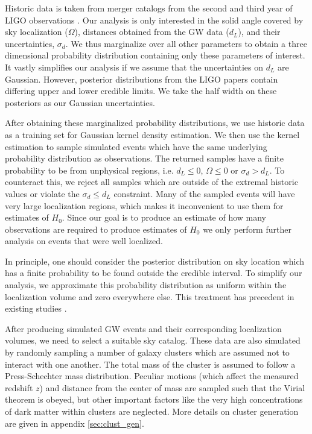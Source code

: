 
Historic data is taken from merger catalogs from the second and third year of LIGO observations \cite{GWTC_2,GWTC_3}. Our analysis is only interested in the solid angle covered by sky localization ($\Omega$), distances obtained from the GW data ($d_L$), and their uncertainties, $\sigma_d$. We thus marginalize over all other parameters to obtain a three dimensional probability distribution containing only these parameters of interest. It vastly simplifies our analysis if we assume that the uncertainties on $d_L$ are Gaussian. However, posterior distributions from the LIGO papers contain differing upper and lower credible limits. We take the half width on these posteriors as our Gaussian uncertainties.

After obtaining these marginalized probability distributions, we use historic data as a training set for Gaussian kernel density estimation. We then use the kernel estimation to sample simulated events which have the same underlying probability distribution as observations. The returned samples have a finite probability to be from unphysical regions, i.e. $d_L \leq 0$, $\Omega\leq 0$ or $\sigma_d > d_L$. To counteract this, we reject all samples which are outside of the extremal historic values or violate the $\sigma_d \leq d_L$ constraint. Many of the sampled events will have very large localization regions, which makes it inconvenient to use them for estimates of $H_0$. Since our goal is to produce an estimate of how many observations are required to produce estimates of $H_0$ we only perform further analysis on events that were well localized.

In principle, one should consider the posterior distribution on sky location which has a finite probability to be found outside the credible interval. To simplify our analysis, we approximate this probability distribution as uniform within the localization volume and zero everywhere else. This treatment has precedent in existing studies \cite{Nair_2018, GW170814_DES}.

After producing simulated GW events and their corresponding localization volumes, we need to select a suitable sky catalog. These data are also simulated by randomly sampling a number of galaxy clusters which are assumed not to interact with one another. The total mass of the cluster is assumed to follow a Press-Schechter mass distribution\cite{Press_1974}. Peculiar motions (which affect the measured redshift $z$) and distance from the center of mass are sampled such that the Virial theorem is obeyed, but other important factors like the very high concentrations of dark matter within clusters are neglected. More details on cluster generation are given in appendix \ref{sec:clust_gen}.
    
